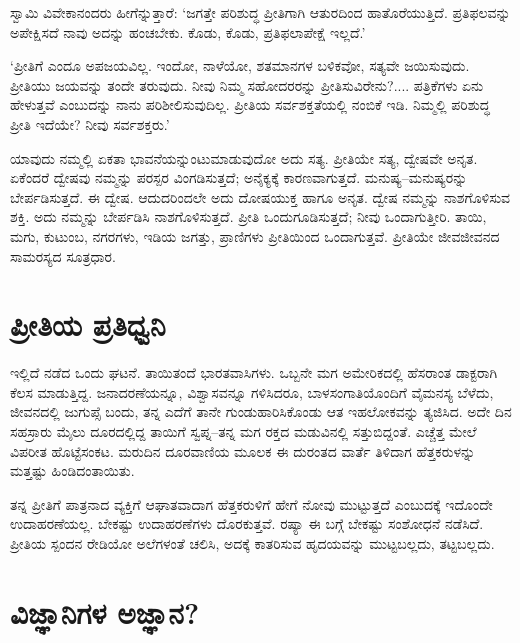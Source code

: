 
ಸ್ವಾಮಿ ವಿವೇಕಾನಂದರು ಹೀಗೆನ್ನುತ್ತಾರೆ: ‘ಜಗತ್ತೇ ಪರಿಶುದ್ಧ ಪ್ರೀತಿಗಾಗಿ ಆತುರದಿಂದ ಹಾತೊರೆ\-ಯುತ್ತಿದೆ. ಪ್ರತಿಫಲವನ್ನು ಅಪೇಕ್ಷಿಸದೆ ನಾವು ಅದನ್ನು ಹಂಚಬೇಕು. ಕೊಡು, ಕೊಡು, ಪ್ರತಿಫಲಾಪೇಕ್ಷೆ ಇಲ್ಲದೆ.’

‘ಪ್ರೀತಿಗೆ ಎಂದೂ ಅಪಜಯವಿಲ್ಲ. ಇಂದೋ, ನಾಳೆಯೋ, ಶತಮಾನಗಳ ಬಳಿಕವೋ, ಸತ್ಯವೇ ಜಯಿಸುವುದು. ಪ್ರೀತಿಯು ಜಯವನ್ನು ತಂದೇ ತರುವುದು. ನೀವು ನಿಮ್ಮ ಸಹೋದರ\-ರನ್ನು ಪ್ರೀತಿಸುವಿರೇನು?.... ಪತ್ರಿಕೆಗಳು ಏನು ಹೇಳುತ್ತವೆ ಎಂಬುದನ್ನು ನಾನು ಪರಿಶೀಲಿಸುವುದಿಲ್ಲ. ಪ್ರೀತಿಯ ಸರ್ವಶಕ್ತತೆಯಲ್ಲಿ ನಂಬಿಕೆ ಇಡಿ. ನಿಮ್ಮಲ್ಲಿ ಪರಿಶುದ್ಧ ಪ್ರೀತಿ ಇದೆಯೇ? ನೀವು ಸರ್ವಶಕ್ತರು.’

ಯಾವುದು ನಮ್ಮಲ್ಲಿ ಏಕತಾ ಭಾವನೆಯನ್ನುಂಟುಮಾಡುವುದೋ ಅದು ಸತ್ಯ. ಪ್ರೀತಿಯೇ ಸತ್ಯ, ದ್ವೇಷವೇ ಅನೃತ. ಏಕೆಂದರೆ ದ್ವೇಷವು ನಮ್ಮನ್ನು ಪರಸ್ಪರ ವಿಂಗಡಿಸುತ್ತದೆ; ಅನೈಕ್ಯಕ್ಕೆ ಕಾರಣವಾಗುತ್ತದೆ. ಮನುಷ್ಯ–ಮನುಷ್ಯರನ್ನು ಬೇರ್ಪಡಿಸುತ್ತದೆ. ಈ ದ್ವೇಷ. ಆದುದರಿಂದಲೇ ಅದು ದೋಷಯುಕ್ತ ಹಾಗೂ ಅನೃತ. ದ್ವೇಷ ನಮ್ಮನ್ನು ನಾಶಗೊಳಿಸುವ ಶಕ್ತಿ. ಅದು ನಮ್ಮನ್ನು ಬೇರ್ಪಡಿಸಿ ನಾಶಗೊಳಿಸುತ್ತದೆ. ಪ್ರೀತಿ ಒಂದುಗೂಡಿಸುತ್ತದೆ; ನೀವು ಒಂದಾಗುತ್ತೀರಿ. ತಾಯಿ, ಮಗು, ಕುಟುಂಬ, ನಗರಗಳು, ಇಡಿಯ ಜಗತ್ತು, ಪ್ರಾಣಿಗಳು ಪ್ರೀತಿಯಿಂದ ಒಂದಾಗುತ್ತವೆ. ಪ್ರೀತಿಯೇ ಜೀವಜೀವನದ ಸಾಮರಸ್ಯದ ಸೂತ್ರಧಾರ.


\section*{ಪ್ರೀತಿಯ ಪ್ರತಿಧ್ವನಿ}


ಇಲ್ಲಿದೆ ನಡೆದ ಒಂದು ಘಟನೆ. ತಾಯಿತಂದೆ ಭಾರತವಾಸಿಗಳು. ಒಬ್ಬನೇ ಮಗ ಅಮೇರಿಕದಲ್ಲಿ ಹೆಸರಾಂತ ಡಾಕ್ಟರಾಗಿ ಕೆಲಸ ಮಾಡುತ್ತಿದ್ದ. ಜನಾದರಣೆಯನ್ನೂ, ವಿಶ್ವಾಸವನ್ನೂ ಗಳಿಸಿದರೂ, ಬಾಳಸಂಗಾತಿಯೊಂದಿಗೆ ವೈಮನಸ್ಯ ಬೆಳೆದು, ಜೀವನದಲ್ಲಿ ಜುಗುಪ್ಸೆ ಬಂದು, ತನ್ನ ಎದೆಗೆ ತಾನೇ ಗುಂಡುಹಾರಿಸಿಕೊಂಡು ಆತ ಇಹಲೋಕವನ್ನು ತ್ಯಜಿಸಿದ. ಅದೇ ದಿನ ಸಹಸ್ರಾರು ಮೈಲು ದೂರದಲ್ಲಿದ್ದ ತಾಯಿಗೆ ಸ್ವಪ್ನ–ತನ್ನ ಮಗ ರಕ್ತದ ಮಡುವಿನಲ್ಲಿ ಸತ್ತುಬಿದ್ದಂತೆ. ಎಚ್ಚೆತ್ತ ಮೇಲೆ ವಿಪರೀತ ಹೊಟ್ಟೆಸಂಕಟ. ಮರುದಿನ ದೂರವಾಣಿಯ ಮೂಲಕ ಈ ದುರಂತದ ವಾರ್ತೆ ತಿಳಿದಾಗ ಹೆತ್ತಕರುಳನ್ನು ಮತ್ತಷ್ಟು ಹಿಂಡಿದಂತಾಯಿತು.

ತನ್ನ ಪ್ರೀತಿಗೆ ಪಾತ್ರನಾದ ವ್ಯಕ್ತಿಗೆ ಆಘಾತವಾದಾಗ ಹೆತ್ತಕರುಳಿಗೆ ಹೇಗೆ ನೋವು ಮುಟ್ಟುತ್ತದೆ ಎಂಬುದಕ್ಕೆ ಇದೊಂದೇ ಉದಾಹರಣೆಯಲ್ಲ. ಬೇಕಷ್ಟು ಉದಾಹರಣೆಗಳು ದೊರಕುತ್ತವೆ. ರಷ್ಯಾ ಈ ಬಗ್ಗೆ ಬೇಕಷ್ಟು ಸಂಶೋಧನೆ ನಡೆಸಿದೆ. ಪ್ರೀತಿಯ ಸ್ಪಂದನ ರೇಡಿಯೋ ಅಲೆಗಳಂತೆ ಚಲಿಸಿ, ಅದಕ್ಕೆ ಕಾತರಿಸುವ ಹೃದಯವನ್ನು ಮುಟ್ಟಬಲ್ಲದು, ತಟ್ಟಬಲ್ಲದು.


\section*{ವಿಜ್ಞಾನಿಗಳ ಅಜ್ಞಾನ?}


